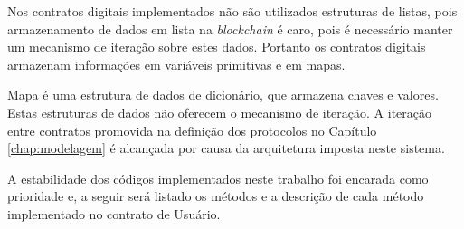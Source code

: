 \documentclass[tcc,capa]{texufpel}
\begin{document}
    Nos contratos digitais implementados não são utilizados estruturas de listas, pois armazenamento de dados em lista na \textit{blockchain} é caro, pois é necessário manter um mecanismo de iteração sobre estes dados. Portanto os contratos digitais armazenam informações em variáveis primitivas e em mapas.
    
    Mapa é uma estrutura de dados de dicionário, que armazena chaves e valores. Estas estruturas de dados não oferecem o mecanismo de iteração. A iteração entre contratos promovida na definição dos protocolos no Capítulo \ref{chap:modelagem} é alcançada por causa da arquitetura imposta neste sistema.

    A estabilidade dos códigos implementados neste trabalho foi encarada como prioridade e, a seguir será listado os métodos e a descrição de cada método implementado no contrato de Usuário.
    
\end{document}
